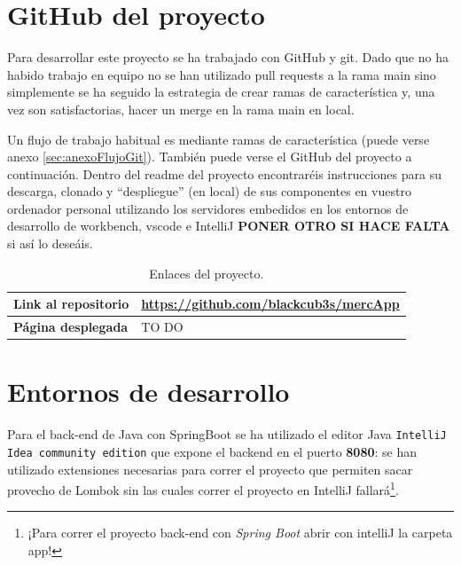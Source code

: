 \documentclass[a4paper,12pt]{report}
\begin{document}
				
			\section{GitHub del proyecto}
			
				Para desarrollar este proyecto se ha trabajado con GitHub y git. Dado que no ha habido trabajo en equipo no se han utilizado pull requests a la rama main sino simplemente se ha seguido la estrategia de crear ramas de característica y, una vez son satisfactorias, hacer un merge en la rama main en local.
				
				Un flujo de trabajo habitual es mediante ramas de característica (puede verse anexo \ref{sec:anexoFlujoGit}). También puede verse el GitHub del proyecto a continuación. Dentro del readme del proyecto encontraréis instrucciones para su descarga, clonado y ``despliegue'' (en local) de sus componentes en vuestro ordenador personal utilizando los servidores embedidos en los entornos de desarrollo de workbench, vscode e IntelliJ \textbf{PONER OTRO SI HACE FALTA} si así lo deseáis.
			

			
			
			
			
			
			
			
			
			
			
			
			
			\begin{table}[h!]
				\centering
				\begin{tabular}{|p{3.8cm}|p{11cm}|}
					\hline
					\textbf{Link al repositorio} & \href{https://github.com/blackcub3s/mercApp}{https://github.com/blackcub3s/mercApp} \\
					\hline
					\textbf{Página desplegada} & TO DO \\ %
					\hline
				\end{tabular}
				\caption{Enlaces  del proyecto.}
				\label{tabla:enlaces}
			\end{table}

	
	
		
			\section{Entornos de desarrollo}
			
				Para el back-end de Java con SpringBoot se ha utilizado el editor Java \texttt{IntelliJ Idea community edition} que expone el backend en el puerto\textbf{ 8080}: se han utilizado extensiones necesarias para correr el proyecto que permiten sacar provecho de Lombok sin las cuales correr el proyecto en IntelliJ fallará\footnote{¡Para correr el proyecto back-end con\textit{ Spring Boot} abrir con intelliJ la carpeta app!}.
				
\end{document}
